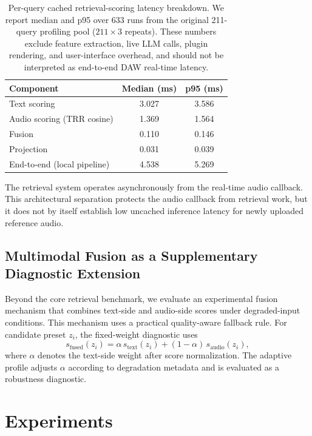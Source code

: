 \begin{table}[t]
	\centering
\caption{Per-query cached retrieval-scoring latency breakdown. We report median and p95 over 633 runs from the original 211-query profiling pool ($211\times 3$ repeats). These numbers exclude feature extraction, live LLM calls, plugin rendering, and user-interface overhead, and should not be interpreted as end-to-end DAW real-time latency.}
	\label{tab:latency_breakdown}
	\begin{tabular}{lcc}
		\toprule
		\textbf{Component} & \textbf{Median (ms)} & \textbf{p95 (ms)} \\
		\midrule
		Text scoring & 3.027 & 3.586 \\
		Audio scoring (TRR cosine) & 1.369 & 1.564 \\
		Fusion & 0.110 & 0.146 \\
		Projection & 0.031 & 0.039 \\
		End-to-end (local pipeline) & 4.538 & 5.269 \\
		\bottomrule
	\end{tabular}
\end{table}

The retrieval system operates asynchronously from the real-time audio callback. This architectural separation protects the audio callback from retrieval work, but it does not by itself establish low uncached inference latency for newly uploaded reference audio.

\subsection{Multimodal Fusion as a Supplementary Diagnostic Extension}
\label{ssec:fusion}

Beyond the core retrieval benchmark, we evaluate an experimental fusion mechanism that combines text-side and audio-side scores under degraded-input conditions. This mechanism uses a practical quality-aware fallback rule.
For candidate preset $z_i$, the fixed-weight diagnostic uses
\begin{equation}
	s_{\mathrm{fused}}(z_i)=\alpha\,s_{\mathrm{text}}(z_i)+(1-\alpha)\,s_{\mathrm{audio}}(z_i),
\end{equation}
where $\alpha$ denotes the text-side weight after score normalization. The adaptive profile adjusts $\alpha$ according to degradation metadata and is evaluated as a robustness diagnostic.

\section{Experiments}
\label{sec:experiments}

